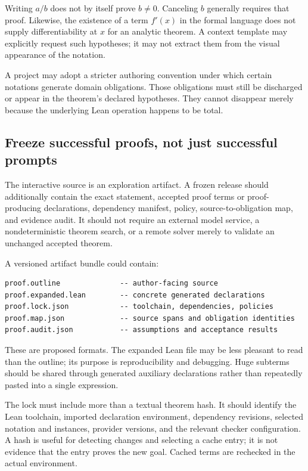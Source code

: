 \documentclass[11pt,a4paper]{article}
\theoremstyle{definition}
\theoremstyle{remark}
\numberwithin{equation}{section}
\begin{document}
Writing $a/b$ does not by itself prove $b\ne0$. Canceling $b$ generally requires that proof. Likewise, the existence of a term $f'(x)$ in the formal language does not supply differentiability at $x$ for an analytic theorem. A context template may explicitly request such hypotheses; it may not extract them from the visual appearance of the notation.

A project may adopt a stricter authoring convention under which certain notations generate domain obligations. Those obligations must still be discharged or appear in the theorem's declared hypotheses. They cannot disappear merely because the underlying Lean operation happens to be total.

\subsection{Freeze successful proofs, not just successful prompts}
The interactive source is an exploration artifact. A frozen release should additionally contain the exact statement, accepted proof terms or proof-producing declarations, dependency manifest, policy, source-to-obligation map, and evidence audit. It should not require an external model service, a nondeterministic theorem search, or a remote solver merely to validate an unchanged accepted theorem.

A versioned artifact bundle could contain:
\begin{lstlisting}
proof.outline              -- author-facing source
proof.expanded.lean        -- concrete generated declarations
proof.lock.json            -- toolchain, dependencies, policies
proof.map.json             -- source spans and obligation identities
proof.audit.json           -- assumptions and acceptance results
\end{lstlisting}
These are proposed formats. The expanded Lean file may be less pleasant to read than the outline; its purpose is reproducibility and debugging. Huge subterms should be shared through generated auxiliary declarations rather than repeatedly pasted into a single expression.

The lock must include more than a textual theorem hash. It should identify the Lean toolchain, imported declaration environment, dependency revisions, selected notation and instances, provider versions, and the relevant checker configuration. A hash is useful for detecting changes and selecting a cache entry; it is not evidence that the entry proves the new goal. Cached terms are rechecked in the actual environment.
\end{document}
